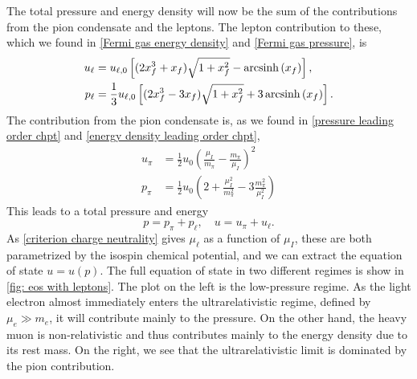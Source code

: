 The total pressure and energy density will now be the sum of the contributions from the pion condensate and the leptons.
The lepton contribution to these, which we found in \autoref{Fermi gas energy density} and \autoref{Fermi gas pressure}, is
%
\begin{align}
    u_\ell 
    &= u_{\ell,0} 
    \left[(2x_f^3 + x_f) \sqrt{1 + x_f^2} - \operatorname{arcsinh}\left(x_f\right)\right], \\
    p_\ell
    &=\frac{1}{3} u_{\ell,0}
    \left[(2x_f^3 - 3x_f) \sqrt{1 + x_f^2} + 3\operatorname{arcsinh}\left(x_f\right)\right].
\end{align}
%
The contribution from the pion condensate is, as we found in \autoref{pressure leading order chpt} and \autoref{energy density leading order chpt},
%
\begin{align}
    u_\pi &= \frac{1}{2} u_0 \left( \frac{\mu_I}{m_\pi} - \frac{m_\pi}{\mu_I}\right)^2 \\
    p_\pi &= \frac{1}{2} u_0 \left( 2 + \frac{\mu_I^2}{m_\pi^2} - 3 \frac{m_\pi^2}{\mu_I^2}  \right)
\end{align}
%
This leads to a total pressure and energy
%
\begin{equation}
    p = p_\pi + p_\ell, \quad u = u_\pi + u_\ell.
\end{equation}
%
As \autoref{criterion charge neutrality} gives $\mu_\ell$ as a function of $\mu_I$, these are both parametrized by the isospin chemical potential, and we can extract the equation of state $u = u(p)$.
The full equation of state in two different regimes is show in \autoref{fig: eos with leptons}.
The plot on the left is the low-pressure regime.
As the light electron almost immediately enters the ultrarelativistic regime, defined by $\mu_e\gg m_e$, it will contribute mainly to the pressure.
On the other hand, the heavy muon is non-relativistic and thus contributes mainly to the energy density due to its rest mass.
On the right, we see that the ultrarelativistic limit is dominated by the pion contribution.

